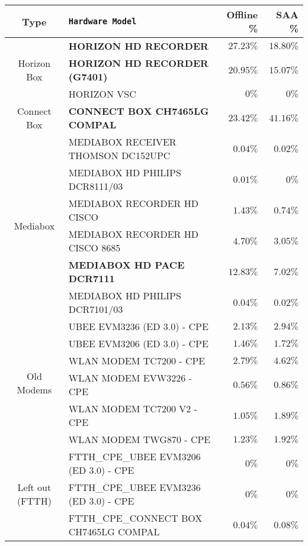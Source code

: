 \begin{table}[h]
\begin{center}
\begin{tabular}{c l r r}
\hline
\textbf{Type} & \textbf{\texttt{Hardware Model}} & \textbf{Offline \%} & \textbf{SAA \%}\\ 
\hline\hline
\multirow{3}{*}{Horizon Box} 		& \textbf{HORIZON HD RECORDER}					& $27.23\%$ 			& $\mathbf{18.80\%}$\\
									& \textbf{HORIZON HD RECORDER (G7401)} 			& $20.95\%$ 			& $\mathbf{15.07\%}$\\
									& HORIZON VSC									& $0\%$ 				& $0\%$\\
\hline						
Connect Box							& \textbf{CONNECT BOX CH7465LG COMPAL}			& $23.42\%$ 			& $\mathbf{41.16\%}$\\
\hline
\multirow{6}{*}{Mediabox} 			& MEDIABOX RECEIVER THOMSON DC152UPC 			& $0.04\%$ 				& $0.02\%$\\
									& MEDIABOX HD PHILIPS DCR8111/03 				& $0.01\%$ 				& $0\%$\\
									& MEDIABOX RECORDER HD CISCO						& $1.43\%$ 				& $0.74\%$\\
									& MEDIABOX RECORDER HD CISCO 8685				& $4.70\%$ 				& $3.05\%$\\
									& \textbf{MEDIABOX HD PACE DCR7111}				& $12.83\%$ 			& $\mathbf{7.02\%}$\\
									& MEDIABOX HD PHILIPS DCR7101/03					& $0.04\%$ 				& $0.02\%$\\
\hline
\multirow{6}{*}{Old Modems} 			& UBEE EVM3236 (ED 3.0) - CPE 					& $2.13\%$ 				& $2.94\%$\\
									& UBEE EVM3206 (ED 3.0) - CPE 					& $1.46\%$ 				& $1.72\%$\\
									& WLAN MODEM TC7200 - CPE						& $2.79\%$ 				& $4.62\%$\\
									& WLAN MODEM EVW3226 - CPE						& $0.56\%$ 				& $0.86\%$\\
									& WLAN MODEM TC7200 V2 - CPE						& $1.05\%$ 				& $1.89\%$\\
									& WLAN MODEM TWG870 - CPE						& $1.23\%$ 				& $1.92\%$\\
\hline 
\multirow{13}{*}{Left out (FTTH)} 	& FTTH\_CPE\_UBEE EVM3206 (ED 3.0) - CPE 		& $0\%$ 				& $0\%$\\
									& FTTH\_CPE\_UBEE EVM3236 (ED 3.0) - CPE 		& $0\%$ 				& $0\%$\\
									& FTTH\_CPE\_CONNECT BOX CH7465LG COMPAL			& $0.04\%$ 				& $0.08\%$\\

\end{tabular}
\end{center}
\end{table}
